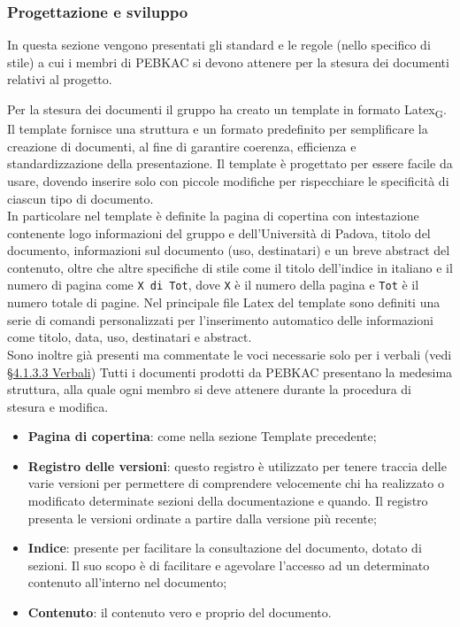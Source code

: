 \subsubsection{Progettazione e sviluppo}
In questa sezione vengono presentati gli standard e le regole (nello specifico di stile) a cui i membri di PEBKAC si devono attenere per la stesura dei documenti relativi al progetto.

Per la stesura dei documenti il gruppo ha creato un template in formato Latex\textsubscript{G}. Il template fornisce una struttura e un formato predefinito per semplificare la creazione di documenti, al fine di garantire coerenza, efficienza e standardizzazione della presentazione. 
Il template è progettato per essere facile da usare, dovendo inserire solo con piccole modifiche per rispecchiare le specificità di ciascun tipo di documento.\\
In particolare nel template è definite la pagina di copertina con intestazione contenente logo informazioni del gruppo e dell'Università di Padova, titolo del documento, informazioni sul documento (uso, destinatari) e un breve abstract del contenuto, oltre che altre specifiche di stile come il titolo dell'indice in italiano e il numero di pagina come \texttt{X di Tot}, dove \texttt{X} è il numero della pagina e \texttt{Tot} è il numero totale di pagine.
Nel principale file Latex del template sono definiti una serie di comandi personalizzati per l'inserimento automatico delle informazioni come titolo, data, uso, destinatari e abstract. \\
Sono inoltre già presenti ma commentate le voci necessarie solo per i verbali (vedi  \hyperref[sec: struttura verbali]{§4.1.3.3 Verbali})
Tutti i documenti prodotti da PEBKAC presentano la medesima struttura, alla quale ogni membro si deve attenere durante la procedura di stesura e modifica.
\begin{itemize}
    \item \textbf{Pagina di copertina}: come nella sezione Template precedente;
    \item \textbf{Registro delle versioni}: questo registro è utilizzato per tenere traccia delle varie versioni per permettere di comprendere velocemente chi ha realizzato o modificato determinate sezioni della documentazione e quando. Il registro presenta le versioni ordinate a partire dalla versione più recente;
     \item \textbf{Indice}: presente per facilitare la consultazione del documento, dotato di sezioni. Il suo scopo è di facilitare e agevolare l’accesso ad un determinato contenuto all'interno nel documento;
     \item \textbf{Contenuto}: il contenuto vero e proprio del documento.
\end{itemize}

